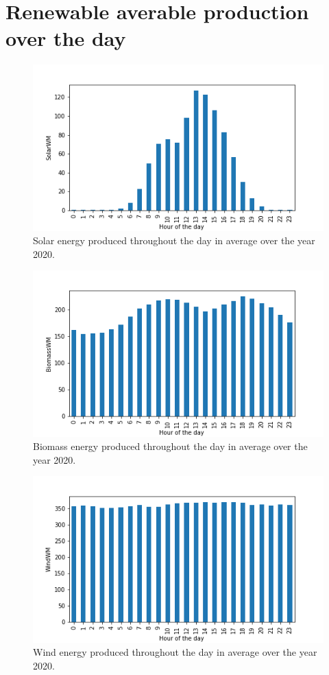 \documentclass[11pt]{article} %
\begin{document}
\clearpage\newpage
\appendix

\section{Renewable averable production over the day}\label{app:renewable}
\begin{figure}[h!]
  \includegraphics[width=0.8\linewidth]{../outputs/SolarWM.png}
  \caption{Solar energy produced throughout the day in average over the year 2020.}
  \label{fig:solar_kwh}
\end{figure}
\begin{figure}[h!]
  \includegraphics[width=0.8\linewidth]{../outputs/BiomassWM.png}
  \caption{Biomass energy produced throughout the day in average over the year 2020.}
  \label{fig:biomass_kwh}
\end{figure}
\begin{figure}[h!]
  \includegraphics[width=0.8\linewidth]{../outputs/WindWM.png}
  \caption{Wind energy produced throughout the day in average over the year 2020.}
  \label{fig:wind_kwh}
\end{figure}
\end{document}
